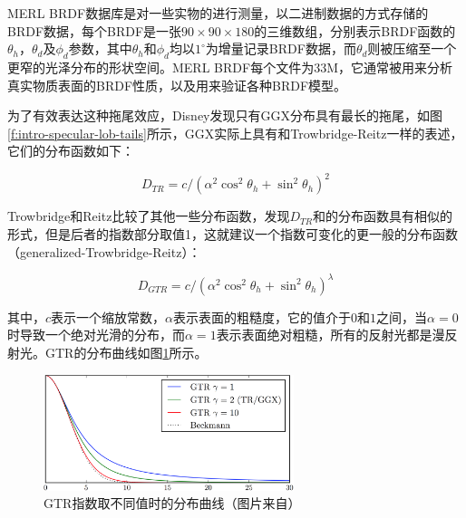 \begin{shaded}
MERL BRDF数据库是对一些实物的进行测量，以二进制数据的方式存储的BRDF数据，每个BRDF是一张$90\times 90\times 180$的三维数组，分别表示BRDF函数的$\theta_h$，$\theta_d$及$\phi_d$参数，其中$\theta_h$和$\phi_d$均以$1^{\circ}$为增量记录BRDF数据，而$\theta_d$则被压缩至一个更窄的光泽分布的形状空间。MERL BRDF每个文件为33M，它通常被用来分析真实物质表面的BRDF性质，以及用来验证各种BRDF模型。
\end{shaded}

为了有效表达这种拖尾效应，Disney发现只有GGX分布\cite{a:Microfacetmodelsforrefractionthroughroughsurfaces}具有最长的拖尾，如图\ref{f:intro-specular-lob-tails}所示，GGX实际上具有和Trowbridge-Reitz\cite{a:Averageirregularityrepresentationofaroughrayreflection}一样的表述，它们的分布函数如下：

\begin{equation}
	D_{TR}=c/(\alpha^2 \cos^2\theta_h +\sin^2\theta_h)^2
\end{equation}

\noindent Trowbridge和Reitz比较了其他一些分布函数，发现$D_{TR}$和\cite{a:DiffuseReflectionofLightfromaMatteSurface}的分布函数具有相似的形式，但是后者的指数部分取值1，这就建议一个指数可变化的更一般的分布函数（generalized-Trowbridge-Reitz）：

\begin{equation}
	D_{GTR}=c/(\alpha^2 \cos^2\theta_h +\sin^2\theta_h)^\lambda
\end{equation}

\noindent 其中，$c$表示一个缩放常数，$\alpha$表示表面的粗糙度，它的值介于$0$和$1$之间，当$\alpha=0$时导致一个绝对光滑的分布，而$\alpha=1$表示表面绝对粗糙，所有的反射光都是漫反射光。GTR的分布曲线如图\ref{f:intro-gtr}所示。

\begin{figure}
	\sidecaption
	\includegraphics[width=0.65\textwidth]{figures/intro/gtr}
	\caption{GTR指数取不同值时的分布曲线（图片来自\cite{a:PhysicallyBasedShadingatDisney}）}
	\label{f:intro-gtr}
\end{figure}

